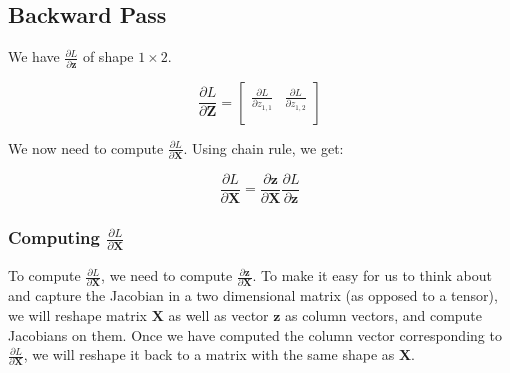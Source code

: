 \documentclass{article}
\newcommand{\vecr}[1]{\bm{#1}}
\newcommand{\matr}[1]{\mathbf{#1}} %
\begin{document}
\subsection{Backward Pass}
We have $\frac{\partial L}{\partial \vecr{z}}$ of shape $1 \times 2$.

\begin{displaymath}
\frac{\partial L}{\partial \matr{Z}} =
\begin{bmatrix}
\frac{\partial L}{\partial z_{1,1}} & \frac{\partial L}{\partial z_{1,2}} \\[0.3em]
\end{bmatrix}
\end{displaymath}

We now need to compute $\frac{\partial L}{\partial \matr{X}}$. Using chain rule, we get:

\begin{equation} \label{dX_sum_along_axis_0}
\frac{\partial L}{\partial \matr{X}} = \frac{\partial \vecr{z}}{\partial \matr{X}}\frac{\partial L}{\partial \vecr{z}}
\end{equation}

\subsubsection{Computing $\frac{\partial L}{\partial \matr{X}}$}
To compute $\frac{\partial L}{\partial \matr{X}}$, we need to compute $\frac{\partial \vecr{z}}{\partial \matr{X}}$. To make it easy for us to think about and capture the Jacobian in a two dimensional matrix (as opposed to a tensor), we will reshape matrix $\matr{X}$ as well as vector $\vecr{z}$ as column vectors, and compute Jacobians on them. Once we have computed the column vector corresponding to $\frac{\partial L}{\partial \matr{X}}$, we will reshape it back to a matrix with the same shape as $\matr{X}$.
\end{document}
